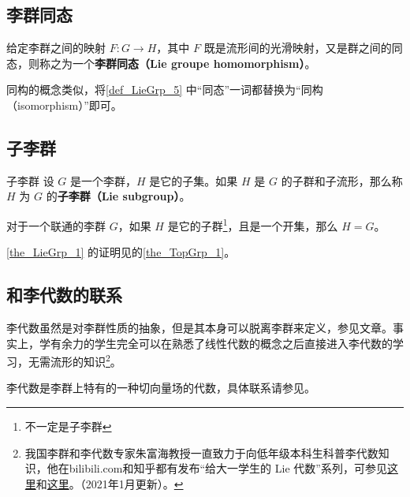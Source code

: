 \subsection{李群同态}

\begin{definition}{}\label{def_LieGrp_5}
给定李群之间的映射 $F:G\to H$，其中 $F$ 既是流形间的光滑映射，又是群之间的同态，则称之为一个\textbf{李群同态（Lie groupe homomorphism）}。
\end{definition}

同构的概念类似，将\autoref{def_LieGrp_5} 中“同态”一词都替换为“同构（isomorphism）”即可。

\subsection{子李群}

\begin{definition}{子李群}
设 $G$ 是一个李群，$H$ 是它的子集。如果 $H$ 是 $G$ 的子群和子流形，那么称 $H$ 为 $G$ 的\textbf{子李群（Lie subgroup）}。
\end{definition}

\begin{theorem}{}\label{the_LieGrp_1}
对于一个联通的李群 $G$，如果 $H$ 是它的子群\footnote{不一定是子李群}，且是一个开集，那么 $H=G$。
\end{theorem}

\autoref{the_LieGrp_1} 的证明见的\autoref{the_TopGrp_1}。


\subsection{和李代数的联系}

李代数虽然是对李群性质的抽象，但是其本身可以脱离李群来定义，参见文章。事实上，学有余力的学生完全可以在熟悉了线性代数的概念之后直接进入李代数的学习，无需流形的知识\footnote{我国李群和李代数专家朱富海教授一直致力于向低年级本科生科普李代数知识，他在bilibili.com和知乎都有发布“给大一学生的 Lie 代数”系列，可参见\href{https://space.bilibili.com/509086270?from=search&seid=2394735306274350134}{这里}和\href{https://zhuanlan.zhihu.com/p/161735986}{这里}。（2021年1月更新）。}。

李代数是李群上特有的一种切向量场的代数，具体联系请参见。





